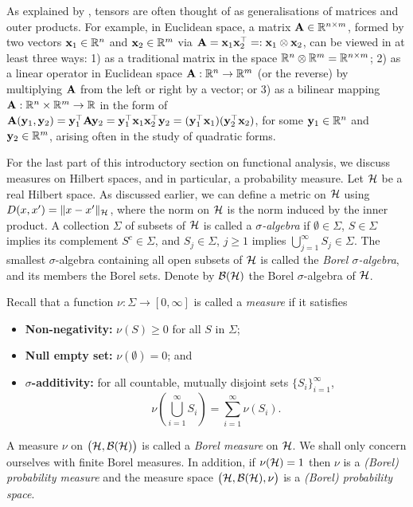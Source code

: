 \begin{remark}
  As explained by \citet[Sec. 10.5, p. 227]{kokoszka2017introduction}, tensors are often thought of as generalisations of matrices and outer products.
  For example, in Euclidean space, a matrix ${\mathbf A} \in \mathbb{R}^{n\times m}$, formed by two vectors ${\mathbf x}_1\in\mathbb{R}^n$ and ${\mathbf x}_2\in\mathbb{R}^m$ via ${\mathbf A} = {\mathbf x}_1{\mathbf x}_2^\top =: {\mathbf x}_1 \otimes {\mathbf x}_2$, can be viewed in at least three ways: 
  1) as a traditional matrix in the space $\mathbb{R}^n \otimes \mathbb{R}^m = \mathbb{R}^{n\times m}$; 
  2) as a linear operator in Euclidean space ${\mathbf A}:\mathbb{R}^n\to\mathbb{R}^m$ (or the reverse) by multiplying ${\mathbf A}$ from the left or right by a vector; or
  3) as a bilinear mapping ${\mathbf A}:\mathbb{R}^n \times \mathbb{R}^m \to \mathbb{R}$ in the form of ${\mathbf A}({\mathbf y}_1,{\mathbf y}_2) = {\mathbf y}_1^\top{\mathbf A} {\mathbf y}_2 = {\mathbf y}_1^\top {\mathbf x}_1 {\mathbf x}_2^\top {\mathbf y}_2 = ({\mathbf y}_1^\top {\mathbf x}_1)({\mathbf y}_2^\top {\mathbf x}_2)$, for some ${\mathbf y}_1\in\mathbb{R}^n$ and ${\mathbf y}_2\in\mathbb{R}^m$, arising often in the study of quadratic forms.
\end{remark}

For the last part of this introductory section on functional analysis, we discuss measures on Hilbert spaces, and in particular, a probability measure.
Let ${\mathcal H}$ be a real Hilbert space. 
As discussed earlier, we can define a metric on ${\mathcal H}$ using $D(x,x') = \lVert x-x'\rVert_{\mathcal H}$, where the norm on ${\mathcal H}$ is the norm induced by the inner product.
A collection $\Sigma$ of subsets of ${\mathcal H}$ is called a \emph{$\sigma$-algebra} if $\emptyset \in \Sigma$, $S \in \Sigma$ implies its complement $S^c \in \Sigma$, and $S_j\in\Sigma$, $j\geq 1$ implies $\bigcup_{j=1}^\infty S_j \in \Sigma$.
The smallest $\sigma$-algebra containing all open subsets of ${\mathcal H}$ is called the \emph{Borel $\sigma$-algebra}, and its members the Borel sets.
Denote by ${\mathcal B}({\mathcal H})$ the Borel $\sigma$-algebra of ${\mathcal H}$.

Recall that a function $\nu:\Sigma\to[0,\infty]$ is called a \emph{measure} if it satisfies
\begin{itemize}
  \item \textbf{Non-negativity:} $\nu(S) \geq 0$ for all $S$ in $\Sigma$;
  \item \textbf{Null empty set:} $\nu(\emptyset) = 0$; and
  \item \textbf{$\sigma$-additivity:} for all countable, mutually disjoint sets $\{S_i\}_{i=1}^\infty$,
  \[
    \nu\left(\bigcup_{i=1}^\infty S_i \right) = \sum_{i=1}^\infty \nu(S_i).
  \]\vspace{-1.5em} 
\end{itemize}
A measure $\nu$ on $\big({\mathcal H},{\mathcal B}({\mathcal H})\big)$ is called a \emph{Borel measure} on ${\mathcal H}$.
We shall only concern ourselves with finite Borel measures. 
In addition, if $\nu({\mathcal H}) = 1$ then $\nu$ is a \emph{(Borel) probability measure} and the measure space $\big({\mathcal H},{\mathcal B}({\mathcal H}),\nu\big)$ is a \emph{(Borel) probability space}.


